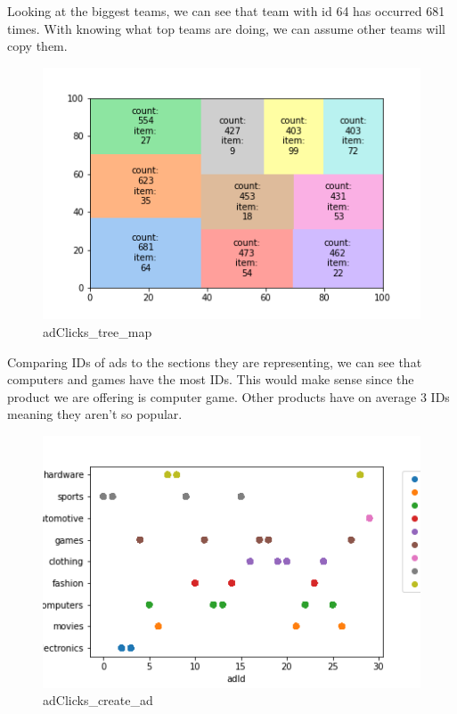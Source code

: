 Looking at the biggest teams, we can see that team with id 64 has occurred 681 times. With knowing what top teams are doing, we can assume other teams will copy them.
\begin{figure}[H]
\includegraphics[scale=0.85]{img/Graphs/adClicks/tree_map_adClicks.png}
\centering
\caption{adClicks\_tree\_map}
\label{fig:adClicks_tree_map}
\end{figure}

Comparing IDs of ads to the sections they are representing, we can see that computers and games have the most IDs. This would make sense since the product we are offering is computer game. Other products have on average 3 IDs meaning they aren't so popular.
\begin{figure}[H]
\includegraphics[scale=0.85]{img/Graphs/adClicks/create_ad_adClicks.png}
\centering
\caption{adClicks\_create\_ad}
\label{fig:adClicks_create_ad}
\end{figure}